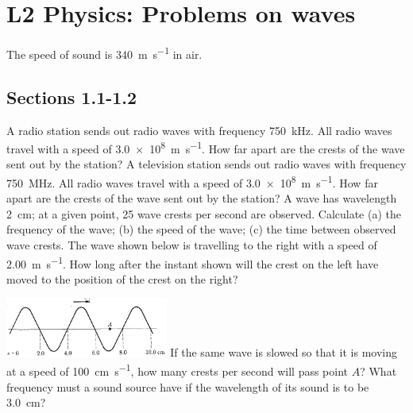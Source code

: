 \documentclass[a4paper]{exam}
\begin{document}
  \section*{L2 Physics: Problems on waves}
  The speed of sound is \SI{340}{\metre\per\second} in air.
  \subsection*{Sections 1.1-1.2}
  \begin{questions}
    \question A radio station sends out radio waves with frequency \SI{750}{\kilo\hertz}. All radio waves travel with a speed
              of \SI{3.0e8}{\metre\per\second}. How far apart are the crests of the wave sent out by the station?
    \question A television station sends out radio waves with frequency \SI{750}{\mega\hertz}. All radio waves travel with a speed
              of \SI{3.0e8}{\metre\per\second}. How far apart are the crests of the wave sent out by the station?
    \question A wave has wavelength \SI{2}{\centi\metre}; at a given point, 25 wave crests per second are observed. Calculate
              (a) the frequency of the wave; (b) the speed of the wave; (c) the time between observed wave crests.
    \question The wave shown below is travelling to the right with a speed of \SI{2.00}{\metre\per\second}. How long
              after the instant shown will the crest on the left have moved to the position of the crest on the right?

              \includegraphics[width=0.4\textwidth]{beuche132}
    \question If the same wave is slowed so that it is moving at a speed of \SI{100}{\centi\metre\per\second}, how many
              crests per second will pass point $ A $?
    \question What frequency must a sound source have if the wavelength of its sound is to be \SI{3.0}{\centi\metre}?
  \end{questions}
\end{document}
